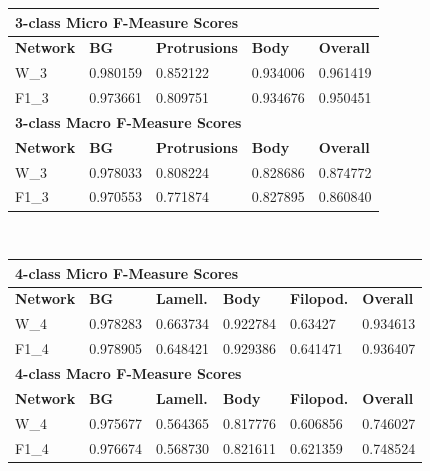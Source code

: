 \begin {table}
	\begin{flushleft}
		\begin {tabular}[!htb]{|l|l|l|l|l|}
			\hline\multicolumn{5}{|l|}{\textbf{3-class Micro F-Measure Scores}} \\ \hline
			\textbf{Network}& \textbf{BG}& \textbf{Protrusions}& \textbf{Body}& \textbf{Overall} \\ \hline
			W\_3& \cellcolor{green!25}0.980159& \cellcolor{green!25}0.852122& 0.934006& \cellcolor{green!25}0.961419 \\ \hline
			F1\_3& 0.973661& 0.809751& \cellcolor{green!25}0.934676& 0.950451\\ \hline
			\multicolumn{5}{|l|}{\textbf{3-class Macro F-Measure Scores}} \\ \hline
			\textbf{Network}& \textbf{BG}& \textbf{Protrusions}& \textbf{Body}& \textbf{Overall} \\ \hline
			W\_3& \cellcolor{green!25}0.978033& \cellcolor{green!25}0.808224& \cellcolor{green!25}0.828686& \cellcolor{green!25}0.874772 \\ \hline
			F1\_3& 0.970553& 0.771874& 0.827895& 0.860840\\ \hline
		\end {tabular}
		\vspace{0.5cm}\\
		\begin {tabular}[!htb]{|l|l|l|l|l|l|}
			\hline\multicolumn{6}{|l|}{\textbf{4-class Micro F-Measure Scores}} \\ \hline
			\textbf{Network}& \textbf{BG}& \textbf{Lamell.}& \textbf{Body}& \textbf{Filopod.}& \textbf{Overall} \\ \hline
			W\_4& 0.978283& \cellcolor{green!25}0.663734& 0.922784& 0.63427& 0.934613 \\ \hline
			F1\_4& \cellcolor{green!25}0.978905& 0.648421& \cellcolor{green!25}0.929386& \cellcolor{green!25}0.641471& \cellcolor{green!25}0.936407 \\ \hline
			\multicolumn{6}{|l|}{\textbf{4-class Macro F-Measure Scores}} \\ \hline
			\textbf{Network}& \textbf{BG}& \textbf{Lamell.}& \textbf{Body}& \textbf{Filopod.}& \textbf{Overall} \\ \hline
			W\_4& 0.975677& 0.564365& 0.817776& 0.606856& 0.746027 \\ \hline
			F1\_4& \cellcolor{green!25}0.976674& \cellcolor{green!25}0.568730& \cellcolor{green!25}0.821611& \cellcolor{green!25}0.621359& \cellcolor{green!25}0.748524 \\ \hline
		\end {tabular}
	\end {flushleft}


\end{table}
